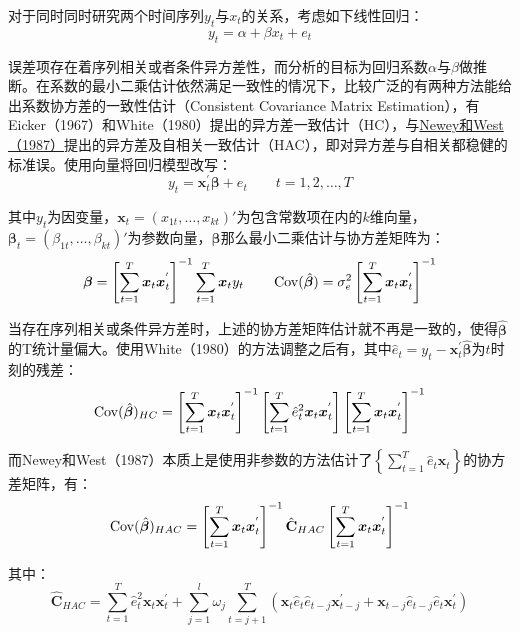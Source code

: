 \documentclass[11pt]{article}
\begin{document}
对于同时同时研究两个时间序列$y_t$与$x_t$的关系，考虑如下线性回归：
\begin{equation*}
    y_t = \alpha + \beta x_t + e_t
\end{equation*}

误差项存在着序列相关或者条件异方差性，而分析的目标为回归系数$\alpha$与$\beta$做推断。在系数的最小二乘估计依然满足一致性的情况下，比较广泛的有两种方法能给出系数协方差的一致性估计（Consistent Covariance Matrix Estimation），有Eicker（1967）和White（1980）提出的异方差一致估计（HC），与\uline{Newey和West（1987）}提出的异方差及自相关一致估计（HAC），即对异方差与自相关都稳健的标准误。使用向量将回归模型改写：
\begin{equation*}
    y_t = \bm{x}_{t}^{'} \bm{\beta} + e_t \qquad t=1,2,\dots,T
\end{equation*}

其中$y_t$为因变量，$\bm{x}_{t} = (x_{1t},\dots,x_{kt})'$为包含常数项在内的$k$维向量，$\bm{\beta}_{t} = (\beta_{1t},\dots,\beta_{kt})'$为参数向量，$\bm{\beta}$那么最小二乘估计与协方差矩阵为：
\begin{equation*}
    \bm{\beta} = \left[ \sum_{t=1}^{T} \bm{x}_t \bm{x}_{t}^{'} \right]^{-1} \sum_{t=1}^{T} \bm{x}_t y_t \qquad 
    \operatorname{Cov}(\hat{\bm{\beta}}) = \sigma_{e}^{2} \left[ \sum_{t=1}^{T} \bm{x}_t \bm{x}_{t}^{'} \right]^{-1} 
\end{equation*}

当存在序列相关或条件异方差时，上述的协方差矩阵估计就不再是一致的，使得$\bm{\hat{\beta}}$的T统计量偏大。使用White（1980）的方法调整之后有，其中$\hat{e}_t = y_t - \bm{x}_{t}^{'} \bm{\hat{\beta}}$为$t$时刻的残差：
\begin{equation*}
    \operatorname{Cov}(\hat{\bm{\beta}})_{HC} = 
    \left[ \sum_{t=1}^{T} \bm{x}_t \bm{x}_{t}^{'} \right]^{-1} 
    \left[ \sum_{t=1}^{T} \hat{e}_{t}^{2} \bm{x}_t \bm{x}_{t}^{'} \right]
    \left[ \sum_{t=1}^{T} \bm{x}_t \bm{x}_{t}^{'} \right]^{-1} 
\end{equation*}

而Newey和West（1987）本质上是使用非参数的方法估计了$\left\{\sum_{t=1}^{T} \hat{e}_t \bm{x}_t \right\}$的协方差矩阵，有：
\begin{equation*}
    \operatorname{Cov}(\hat{\bm{\beta}})_{HAC} = 
    \left[ \sum_{t=1}^{T} \bm{x}_t \bm{x}_{t}^{'} \right]^{-1} 
    \hat{\mathbf{C}}_{HAC}
    \left[ \sum_{t=1}^{T} \bm{x}_t \bm{x}_{t}^{'} \right]^{-1} 
\end{equation*}

其中：
\begin{equation*}
    \hat{\mathbf{C}}_{HAC} = \sum_{t=1}^{T}\hat{e}_{t}^{2} \bm{x}_t \bm{x}_{t}^{'} + \sum_{j=1}^{l} \omega_j \sum_{t=j+1}^{T}\left( \bm{x}_t \hat{e}_t \hat{e}_{t-j} \bm{x}_{t-j}^{'} + \bm{x}_{t-j} \hat{e}_{t-j} \hat{e}_t \bm{x}_{t}^{'} \right)
\end{equation*}
\end{document}
